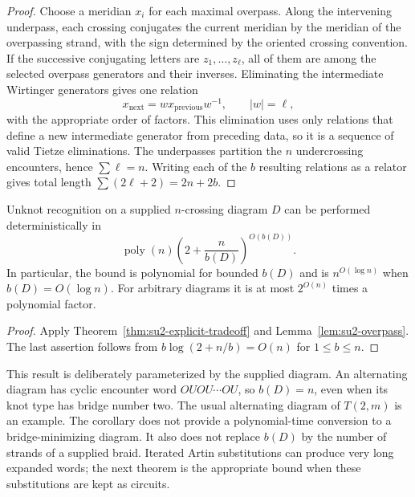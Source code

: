 \begin{proof}
Choose a meridian $x_i$ for each maximal overpass.  Along the intervening
underpass, each crossing conjugates the current meridian by the meridian
of the overpassing strand, with the sign determined by the oriented
crossing convention.  If the successive conjugating letters are
$z_1,\ldots,z_\ell$, all of them are among the selected overpass
generators and their inverses.  Eliminating the intermediate Wirtinger
generators gives one relation
\[
 x_{\mathrm{next}}=w x_{\mathrm{previous}}w^{-1},\qquad |w|=\ell,
\]
with the appropriate order of factors.  This elimination uses only
relations that define a new intermediate generator from preceding data,
so it is a sequence of valid Tietze eliminations.  The underpasses partition
the $n$ undercrossing encounters, hence $\sum\ell=n$.  Writing each of
the $b$ resulting relations as a relator gives total length
$\sum(2\ell+2)=2n+2b$.
\end{proof}

\begin{corollary}
\label{cor:su2-overpass}
Unknot recognition on a supplied $n$-crossing diagram $D$ can be performed
deterministically in
\[
 \operatorname{poly}(n)\left(2+\frac{n}{b(D)}\right)^{O(b(D))}.
\]
In particular, the bound is polynomial for bounded $b(D)$ and is
$n^{O(\log n)}$ when $b(D)=O(\log n)$.  For arbitrary diagrams it is
at most $2^{O(n)}$ times a polynomial factor.
\end{corollary}

\begin{proof}
Apply Theorem~\ref{thm:su2-explicit-tradeoff} and
Lemma~\ref{lem:su2-overpass}.  The last assertion follows from
$b\log(2+n/b)=O(n)$ for $1\leq b\leq n$.
\end{proof}

This result is deliberately parameterized by the supplied diagram.
An alternating diagram has cyclic encounter word $OUOU\cdots OU$, so
$b(D)=n$, even when its knot type has bridge number two.  The usual
alternating diagram of $T(2,m)$ is an example.  The corollary does not
provide a polynomial-time conversion to a bridge-minimizing diagram.
It also does not replace $b(D)$ by the number of strands of a supplied
braid.  Iterated Artin substitutions can produce very long expanded words;
the next theorem is the appropriate bound when these substitutions are
kept as circuits.


